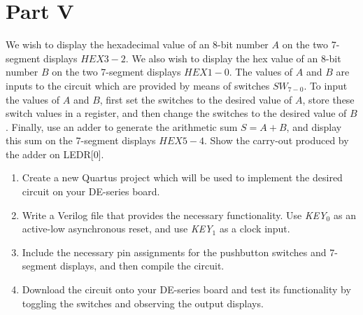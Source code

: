 \documentclass[epsfig,10pt,fullpage]{article}
\newcommand{\CommonDocsPath}{../../../common/docs}
\begin{document}
\section*{Part V}
We wish to display the hexadecimal value of an 8-bit number $A$
on the two 7-segment displays $HEX3-2$.  We also wish to display the
hex value of an 8-bit number $B$ on the two 7-segment displays $HEX1-0$. 
The values of $A$ and $B$ are inputs to the circuit which are
provided by means of switches $SW_{7-0}$.  To input the values of $A$ and $B$, 
first set the switches to the desired value of $A$, store these switch values in a register, 
and then change the switches to the desired value of $B$.  Finally, use an adder to 
generate the arithmetic sum $S = A + B$, and display this sum on the 7-segment 
displays $HEX5-4$. Show the carry-out produced by the adder on LEDR[0].
\begin{enumerate}
\item Create a new Quartus project which will be used to implement the desired
circuit on your DE-series board.
\item Write a Verilog file that provides the necessary functionality. Use {\it KEY}$_0$ as
an active-low asynchronous reset, and use {\it KEY}$_1$ as a clock input.
\item Include the necessary pin assignments for the pushbutton switches and 7-segment
displays, and then compile the circuit.
\item Download the circuit onto your DE-series board and test its functionality 
by toggling the switches and observing the output displays.
\end{enumerate}




\end{document}
